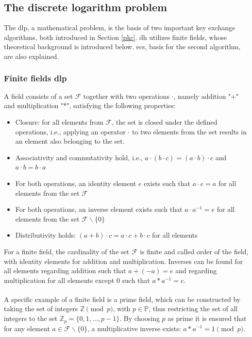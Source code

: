 \subsection{The discrete logarithm problem}\label{refDLP}
The \gls{dlp}, a mathematical problem, is the basis of two important key exchange algorithms, both introduced in Section \ref{pkc}. \gls{dh} utilizes finite fields, whose
theoretical background is introduced below. \glspl{ec}, basis for the second algorithm, are also explained.

\subsubsection{Finite fields \gls{dlp}}
A field consists of a set $\mathcal{F}$ together with two operations $\cdot$, namely addition "+" and multiplication "*", satisfying the following properties:
\begin{itemize}
 \item  Closure: for all elements from $\mathcal{F}$, the set is closed under the defined operations, i.e., applying an operator $\cdot$ to two elements from the set results in an
element also belonging to the set.
 \item Associativity and commutativity hold, i.e., $a \cdot (b \cdot c) = (a \cdot b) \cdot c$ and $a \cdot b = b \cdot a$
 \item For both operations, an identity element $e$ exists such that $a\cdot e = a$  for all elements from the set $\mathcal{F}$ 
 \item For both operations, an inverse element exists such that $a\cdot a^{-1} = e$ for all elements from the set $\mathcal{F} \backslash \{0\}$ 
 \item Distributivity holds: $(a+b) \cdot c = a \cdot c + b \cdot c$ for all elements 
\end{itemize}
For a finite field, the cardinality of the set 
$\mathcal{F}$ is finite and called order of the field, with identity elements for addition and
multiplication. Inverses can be found for all
elements regarding addition such that $a + (-a) = e$ and regarding multiplication for all elements except ${0}$ such that $a * a^{-1} = e$.
\\
\\
A specific example of a finite field is a prime field, which can be constructed by taking the set of integers $\mathbb{Z}\pmod p$, with $p \in \mathbb{P}$, thus
restricting the set of all integers to the set $\mathbb{Z}_p = \{0, 1, ..., p-1\}$.
By choosing $p$ as prime it is ensured that for any element $a \in \mathcal{F} \backslash\{0\}$, a multiplicative inverse exists: $ a * a^{-1} = 1 \pmod p$.
